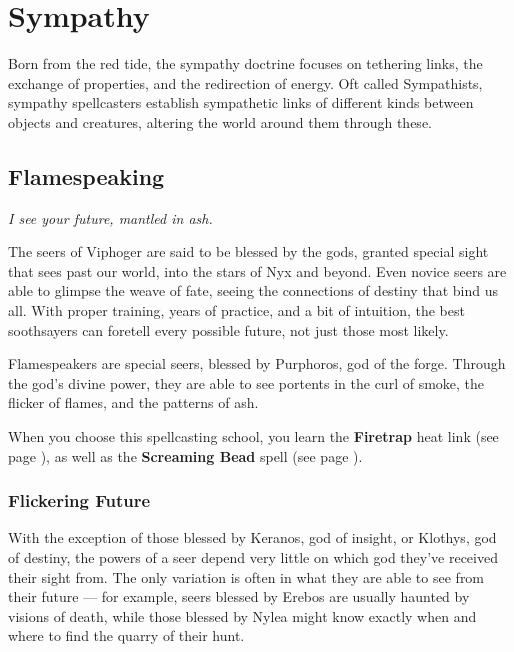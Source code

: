 \section{Sympathy} \label{sec::sympathy}

Born from the red tide, the sympathy doctrine focuses on tethering links, the exchange of properties, and the redirection of energy.
Oft called Sympathists, sympathy spellcasters establish sympathetic links of different kinds between objects and creatures, altering the world around them through these.

\subsection*{Flamespeaking} \label{ssec::flamespeaking}
    \textit{I see your future, mantled in ash.}

    The seers of Viphoger are said to be blessed by the gods, granted special sight that sees past our world, into the stars of Nyx and beyond.
    Even novice seers are able to glimpse the weave of fate, seeing the connections of destiny that bind us all.
    With proper training, years of practice, and a bit of intuition, the best soothsayers can foretell every possible future, not just those most likely.

    Flamespeakers are special seers, blessed by Purphoros, god of the forge.
    Through the god's divine power, they are able to see portents in the curl of smoke, the flicker of flames, and the patterns of ash.

    When you choose this spellcasting school, you learn the \textbf{Firetrap} heat link (see page \pageref{medium::firetrap}), as well as the \textbf{Screaming Bead} spell (see page \pageref{spell::screamingbead}).

    \subsubsection{Flickering Future}
        With the exception of those blessed by Keranos, god of insight, or Klothys, god of destiny, the powers of a seer depend very little on which god they've received their sight from.
        The only variation is often in what they are able to see from their future --- for example, seers blessed by Erebos are usually haunted by visions of death, while those blessed by Nylea might know exactly when and where to find the quarry of their hunt.

